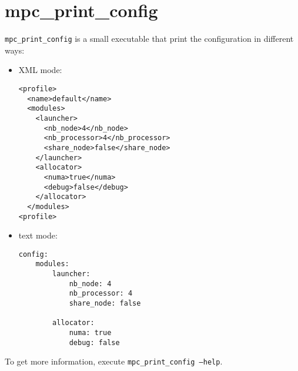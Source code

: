 \documentclass{article}
\begin{document}
\section{mpc\_print\_config}

\texttt{mpc\_print\_config} is a small executable that print the configuration in different ways:
\begin{itemize}
\item XML mode:
\lstset{language=XML}
\begin{lstlisting}
<profile>
  <name>default</name>
  <modules>
    <launcher>
      <nb_node>4</nb_node>
      <nb_processor>4</nb_processor>
      <share_node>false</share_node>
    </launcher>
    <allocator>
      <numa>true</numa>
      <debug>false</debug>
    </allocator>
  </modules>
<profile>
\end{lstlisting}
\item text mode:
\lstset{language=bash}
\begin{lstlisting}
config:
    modules:
        launcher:
            nb_node: 4
            nb_processor: 4
            share_node: false

        allocator:
            numa: true
            debug: false
\end{lstlisting}
\end{itemize}

\noindent To get more information, execute \texttt{mpc\_print\_config --help}.
\end{document}

